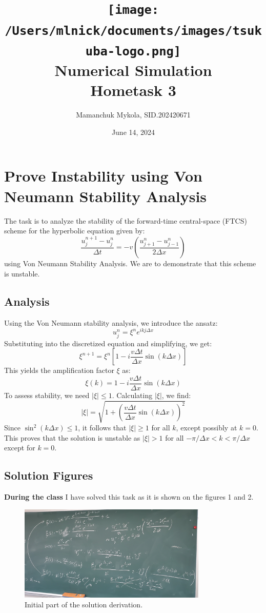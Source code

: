 \documentclass{article}
\title{
    \texttt{[image: /Users/mlnick/documents/images/tsukuba-logo.png]} \\
    \vspace{2mm}
    \textbf{Numerical Simulation} \\
    \vspace{3mm}    
    Hometask 3
}
\author{Mamanchuk Mykola, SID.202420671}
\date{June 14, 2024}
\begin{document}
\maketitle


\setlength{\fboxsep}{0pt} %
\setlength{\fboxrule}{0.5pt} %

\section{Prove Instability using Von Neumann Stability Analysis}

The task is to analyze the stability of the forward-time central-space (FTCS) scheme for the hyperbolic equation given by:
\[
\frac{u_j^{n+1} - u_j^n}{\Delta t} = -v \left(\frac{u_{j+1}^n - u_{j-1}^n}{2\Delta x}\right)
\]
using Von Neumann Stability Analysis. We are to demonstrate that this scheme is unstable.

\subsection{Analysis}

Using the Von Neumann stability analysis, we introduce the ansatz:
\[
u_j^n = \xi^n e^{ikj\Delta x}
\]
Substituting into the discretized equation and simplifying, we get:
\[
\xi^{n+1} = \xi^n \left[ 1 - i \frac{v\Delta t}{\Delta x} \sin(k\Delta x) \right]
\]
This yields the amplification factor \( \xi \) as:
\[
\xi(k) = 1 - i \frac{v\Delta t}{\Delta x} \sin(k\Delta x)
\]
To assess stability, we need \( |\xi| \leq 1 \). Calculating \( |\xi| \), we find:
\[
|\xi| = \sqrt{1 + \left(\frac{v\Delta t}{\Delta x} \sin(k\Delta x)\right)^2}
\]
Since \( \sin^2(k\Delta x) \leq 1 \), it follows that \( |\xi| \geq 1 \) for all \( k \), except possibly at \( k = 0 \). This proves that the solution is unstable as \( |\xi| > 1 \) for all \( -\pi/\Delta x < k < \pi/\Delta x \) except for \( k = 0 \).

\subsection{Solution Figures}

\textbf{During the class} I have solved this task as it is shown on the figures 1 and 2.

\begin{figure}[h!]
    \centering
    \includegraphics[width=0.8\textwidth]{materials/ph1.jpg}
    \caption{Initial part of the solution derivation.}
    \label{fig:ph1}
\end{figure}
\end{document}
